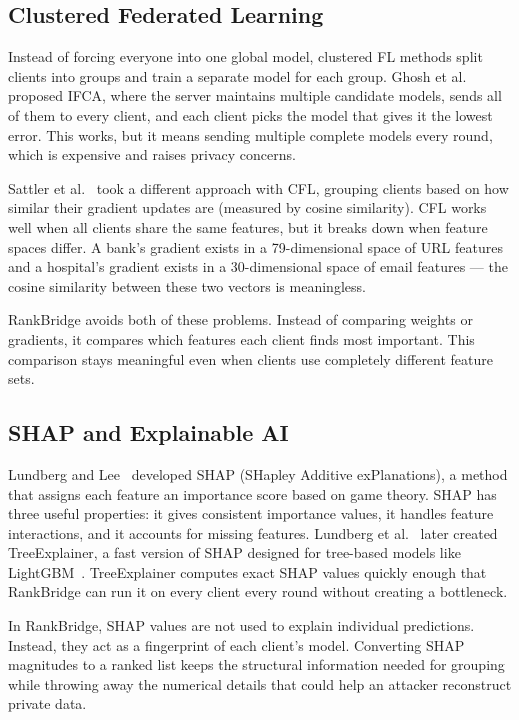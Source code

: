 \documentclass[12pt,a4paper]{article}
\begin{document}
\subsection{Clustered Federated Learning}

Instead of forcing everyone into one global model, clustered FL methods split clients into groups and train a separate model for each group. Ghosh et al.~\cite{ghosh2020ifca} proposed IFCA, where the server maintains multiple candidate models, sends all of them to every client, and each client picks the model that gives it the lowest error. This works, but it means sending multiple complete models every round, which is expensive and raises privacy concerns.

Sattler et al.~\cite{sattler2021cfl} took a different approach with CFL, grouping clients based on how similar their gradient updates are (measured by cosine similarity). CFL works well when all clients share the same features, but it breaks down when feature spaces differ. A bank's gradient exists in a 79-dimensional space of URL features and a hospital's gradient exists in a 30-dimensional space of email features --- the cosine similarity between these two vectors is meaningless.

RankBridge avoids both of these problems. Instead of comparing weights or gradients, it compares which features each client finds most important. This comparison stays meaningful even when clients use completely different feature sets.

\subsection{SHAP and Explainable AI}

Lundberg and Lee~\cite{lundberg2017shap} developed SHAP (SHapley Additive exPlanations), a method that assigns each feature an importance score based on game theory. SHAP has three useful properties: it gives consistent importance values, it handles feature interactions, and it accounts for missing features. Lundberg et al.~\cite{lundberg2020treeshap} later created TreeExplainer, a fast version of SHAP designed for tree-based models like LightGBM~\cite{ke2017lightgbm}. TreeExplainer computes exact SHAP values quickly enough that RankBridge can run it on every client every round without creating a bottleneck.

In RankBridge, SHAP values are not used to explain individual predictions. Instead, they act as a fingerprint of each client's model. Converting SHAP magnitudes to a ranked list keeps the structural information needed for grouping while throwing away the numerical details that could help an attacker reconstruct private data.
\end{document}
